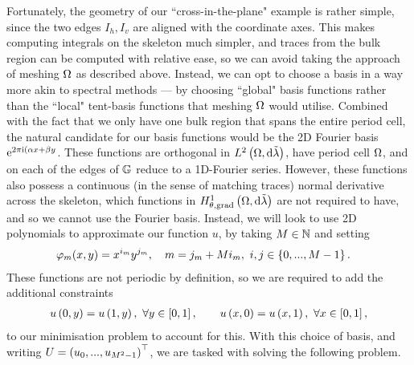 Fortunately, the geometry of our ``cross-in-the-plane" example is rather simple, since the two edges $I_h, I_v$ are aligned with the coordinate axes.
This makes computing integrals on the skeleton much simpler, and traces from the bulk region can be computed with relative ease, so we can avoid taking the approach of meshing $\Omega$ as described above.
Instead, we can opt to choose a basis in a way more akin to spectral methods --- by choosing ``global" basis functions rather than the ``local" tent-basis functions that meshing $\Omega$ would utilise.
Combined with the fact that we only have one bulk region that spans the entire period cell, the natural candidate for our basis functions would be the 2D Fourier basis $\mathrm{e}^{2\pi\mathrm{i}(\alpha x + \beta y}$.
These functions are orthogonal in $L^{2}\left( \Omega,\mathrm{d}\tilde{\lambda} \right)$, have period cell $\Omega$, and on each of the edges of $\mathbb{G}$ reduce to a 1D-Fourier series.
However, these functions also possess a continuous (in the sense of matching traces) normal derivative across the skeleton, which functions in $H^1_{\theta, \mathrm{grad}}\left( \Omega, \mathrm{d}\tilde{\lambda} \right)$ are not required to have, and so we cannot use the Fourier basis.
Instead, we will look to use 2D polynomials to approximate our function $u$, by taking $M\in\mathbb{N}$ and setting
\begin{align} \label{eq:2DPolyBasisDef}
	\varphi_m(x,y) &= x^{i_m} y^{j_m}, \quad m = j_m + Mi_m, \ i,j\in\clbracs{0,...,M-1}.
\end{align}
These functions are not periodic by definition, so we are required to add the additional constraints
\begin{align*}
	u\left( 0,y \right) = u\left( 1,y \right), \ \forall y\in\left[ 0,1 \right], 
	\qquad 
	u\left( x,0 \right) = u\left( x,1 \right), \ \forall x\in\left[ 0,1 \right],
\end{align*}
to our minimisation problem to account for this.
With this choice of basis, and writing $U = \left( u_0,...,u_{M^2-1} \right)^\top$, we are tasked with solving the following problem.
